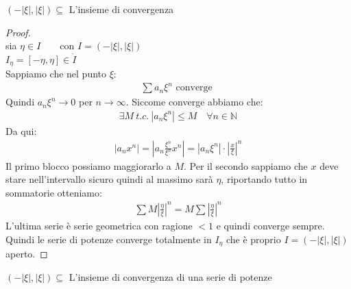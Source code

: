 \documentclass[a4paper, oneside]{article}
\begin{document}
\begin{observation}
  $(-|\xi|, |\xi|) \subseteq$ L'insieme di convergenza
\end{observation}


\begin{proof}
  \hfil\\
  sia $\eta \in I \qquad \text{con } I = (-|\xi|, |\xi|)$\\
  $I_\eta = [-\eta, \eta] \in \mathring{I}$\\
  Sappiamo che nel punto $\xi$:
  \begin{gather*}
    \sum a_n \xi^n \text{ converge }
  \end{gather*}
  Quindi $a_n \xi^n \to 0$ per $n \to \infty$. Siccome converge abbiamo che:
  \begin{gather*}
    \exists M \ t.c. \ \left\lvert a_n \xi^n \right\rvert \leq M \quad \forall n \in \mathbb{N}
  \end{gather*}
  Da qui:
  \begin{gather*}
    |a_n x^n| = \left\lvert a_n \frac{\xi^n}{\xi^n} x^n \right\rvert = \left\lvert a_n \xi^n \right\rvert \cdot \left\lvert \frac{x}{\xi} \right\rvert^n
  \end{gather*}
  Il primo blocco possiamo maggiorarlo a $M$. Per il secondo sappiamo che $x$ deve stare nell'intervallo sicuro quindi al massimo sarà $\eta$, riportando tutto in sommatorie otteniamo:
  \begin{gather*}
    \sum M \left\lvert \frac{\eta}{\xi} \right\rvert ^n = M \sum \left\lvert \frac{\eta}{\xi} \right\rvert^n
  \end{gather*}
  L'ultima serie è serie geometrica con ragione $< 1$ e quindi converge sempre.\\
  Quindi le serie di potenze converge totalmente in $I_\eta$ che è proprio $I = (-|\xi|, |\xi|)$ aperto.
\end{proof}


\begin{aside}
  $\left(-|\xi|, |\xi|\right) \subseteq$ L'insieme di convergenza di una serie di potenze
\end{aside}
\end{document}
